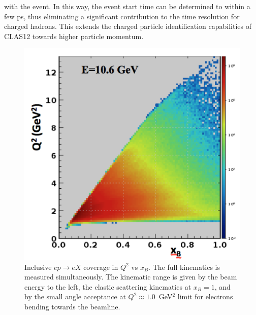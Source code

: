 \documentclass[final,3p,twocolumn]{elsarticle}
\begin{document}
with the event. In this way, the event start time can be determined to within a few ps, thus eliminating a significant contribution to the time resolution for charged hadrons. This extends the charged particle identification capabilities of 
CLAS12 towards higher particle momentum.
\begin{figure}[htbp!]
\centerline{\includegraphics[width=1.0\columnwidth]{e-inclusive.png}}
\caption{Inclusive $ep \to eX$ coverage in $Q^2$ vs $x_B$.  
The full kinematics is measured simultaneously. 
The kinematic range is given by the beam energy to the left, the elastic scattering kinematics at $x_B = 1$, and by the small angle acceptance at $Q^2 \approx 1.0$~GeV$^2$ limit for electrons bending towards the beamline. } 
\label{electron-acceptance}
\end{figure}
\end{document}
